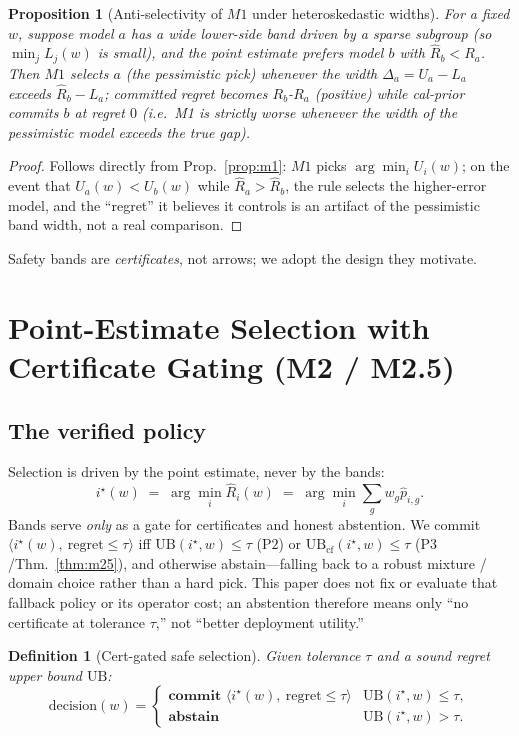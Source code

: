\documentclass{article}
\newtheorem{proposition}{Proposition}
\newtheorem{definition}{Definition}
\begin{document}
\begin{proposition}[Anti-selectivity of $M1$ under heteroskedastic widths]
\label{prop:m1anti}
For a fixed $w$, suppose model $a$ has a wide lower-side band driven by a sparse subgroup
(so $\min_j L_j(w)$ is small), and the point estimate prefers model $b$ with $\hat R_b<R_a$.
Then $M1$ selects $a$ (the pessimistic pick) whenever the width
$\Delta_a=U_a-L_a$ exceeds $\hat R_b-L_a$; committed regret becomes
$R_b$-$R_a$ (positive) while cal-prior commits $b$ at regret $0$ (i.e.~M1 is strictly
worse whenever the width of the pessimistic model exceeds the true gap).
\end{proposition}
\begin{proof}
Follows directly from Prop.~\ref{prop:m1}: $M1$ picks $\arg\min_i U_i(w)$; on the event that
$U_a(w)<U_b(w)$ while $\hat R_a>\hat R_b$, the rule selects the higher-error model, and the
``regret'' it believes it controls is an artifact of the pessimistic band width, not a real
comparison.
\end{proof}

Safety bands are \emph{certificates}, not arrows; we adopt the design they motivate.

\section{Point-Estimate Selection with Certificate Gating (M2 / M2.5)}
\label{sec:m2}
\suppressfloats[t]

\subsection{The verified policy}
Selection is driven by the point estimate, never by the bands:
\[
  i^\star(w)\;=\;\arg\min_i \hat R_i(w)\;=\;\arg\min_i \textstyle\sum_g w_g \hat p_{i,g}.
\]
Bands serve \emph{only} as a gate for certificates and honest abstention. We commit
$\langle i^\star(w),\ \mathrm{regret}\le\tau\rangle$ iff $\mathrm{UB}(i^\star,w)\le\tau$
($\mathrm{P2}$) or $\mathrm{UB}_{\mathrm{cf}}(i^\star,w)\le\tau$ ($\mathrm{P3}$/Thm.~\ref{thm:m25}),
and otherwise abstain---falling back to a robust mixture / domain choice rather than a hard
pick. This paper does not fix or evaluate that fallback policy or its operator cost; an
abstention therefore means only ``no certificate at tolerance $\tau$,'' not ``better
deployment utility.''

\begin{definition}[Cert-gated safe selection]
\label{def:gated}
Given tolerance $\tau$ and a sound regret upper bound $\mathrm{UB}$:
\[
  \mathrm{decision}(w)=\begin{cases}
    \textbf{commit }\langle i^\star(w),\ \mathrm{regret}\le\tau\rangle &
      \mathrm{UB}(i^\star,w)\le\tau,\\
    \textbf{abstain} & \mathrm{UB}(i^\star,w)>\tau.
  \end{cases}
\]
\end{definition}
\end{document}
